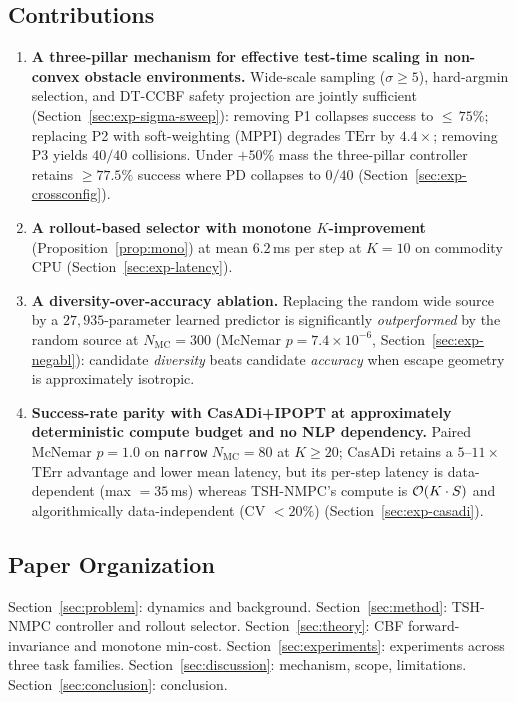 \documentclass[11pt,onecolumn,a4paper]{article}
\newcommand{\Nm}{N_{\mathrm{MC}}}
\newcommand{\TErr}{\mathrm{TErr}}
\begin{document}
\subsection{Contributions}

\begin{enumerate}
\item \textbf{A three-pillar mechanism for effective test-time scaling
in non-convex obstacle environments.} Wide-scale sampling
($\sigma \ge 5$), hard-argmin selection, and DT-CCBF safety projection
are jointly sufficient
(Section~\ref{sec:exp-sigma-sweep}): removing P1 collapses success
to ${\le}\,75\%$; replacing P2 with soft-weighting (MPPI) degrades
$\TErr$ by $4.4\times$; removing P3 yields $40/40$ collisions.
Under $+50\%$ mass the
three-pillar controller retains $\ge 77.5\%$ success where PD collapses
to $0/40$ (Section~\ref{sec:exp-crossconfig}).

\item \textbf{A rollout-based selector with monotone $K$-improvement}
(Proposition~\ref{prop:mono}) at mean $6.2\,$ms per step at
$K = 10$ on commodity CPU (Section~\ref{sec:exp-latency}).

\item \textbf{A diversity-over-accuracy ablation.}
Replacing the random wide source by a $27{,}935$-parameter learned
predictor is significantly \emph{outperformed} by the random source
at $\Nm = 300$ (McNemar $p = 7.4 \times 10^{-6}$,
Section~\ref{sec:exp-negabl}): candidate \emph{diversity} beats
candidate \emph{accuracy} when escape geometry is approximately
isotropic.

\item \textbf{Success-rate parity with CasADi+IPOPT at approximately
deterministic compute budget and no NLP dependency.} Paired McNemar
$p = 1.0$ on \texttt{narrow} $N_{\mathrm{MC}} = 80$ at $K \ge 20$;
CasADi retains a $5$--$11\times$ $\TErr$ advantage and lower mean
latency, but its per-step latency is data-dependent (max $= 35\,$ms)
whereas TSH-NMPC's compute is ${\cal O}(K \cdot S)$ and
algorithmically data-independent (CV $< 20\%$)
(Section~\ref{sec:exp-casadi}).
\end{enumerate}

\subsection{Paper Organization}

Section~\ref{sec:problem}: dynamics and background.
Section~\ref{sec:method}: TSH-NMPC controller and rollout selector.
Section~\ref{sec:theory}: CBF forward-invariance and monotone min-cost.
Section~\ref{sec:experiments}: experiments across three task families.
Section~\ref{sec:discussion}: mechanism, scope, limitations.
Section~\ref{sec:conclusion}: conclusion.
\end{document}
